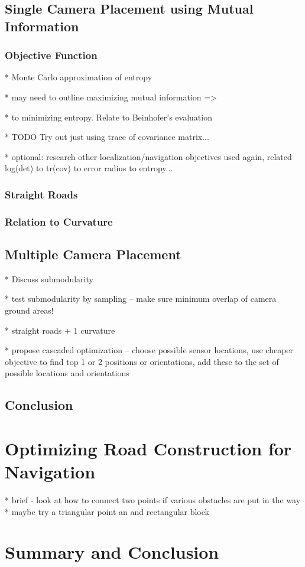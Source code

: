 \documentclass[a4paper,12pt,twoside,openright]{report}
\begin{document}


\section{Single Camera Placement using Mutual Information}

\subsection{Objective Function}
\label{cameraplacement:mutualinf}

* Monte Carlo approximation of entropy

* may need to outline maximizing mutual information =>

* to minimizing entropy. Relate to Beinhofer's evaluation

* TODO Try out just using trace of covariance matrix...

* optional: research other localization/navigation objectives used again, related log(det) to tr(cov) to error radius to entropy...
\subsection{Straight Roads}

\subsection{Relation to Curvature}



\section{Multiple Camera Placement}
* Discuss submodularity

* test submodularity by sampling -- make sure minimum overlap of camera ground areas!

* straight roads + 1 curvature

* propose cascaded optimization -- choose possible sensor locations, use cheaper objective to find top 1 or 2 
positions or orientations, add these to the set of possible locations and orientations



\section{Conclusion}

\chapter{Optimizing Road Construction for Navigation}

* brief - look at how to connect two points if various obstacles are put in the way
* maybe try a triangular point an and rectangular block 


\chapter{Summary and Conclusion} 




\appendix
\singlespacing

\printbibliography
\end{document}
